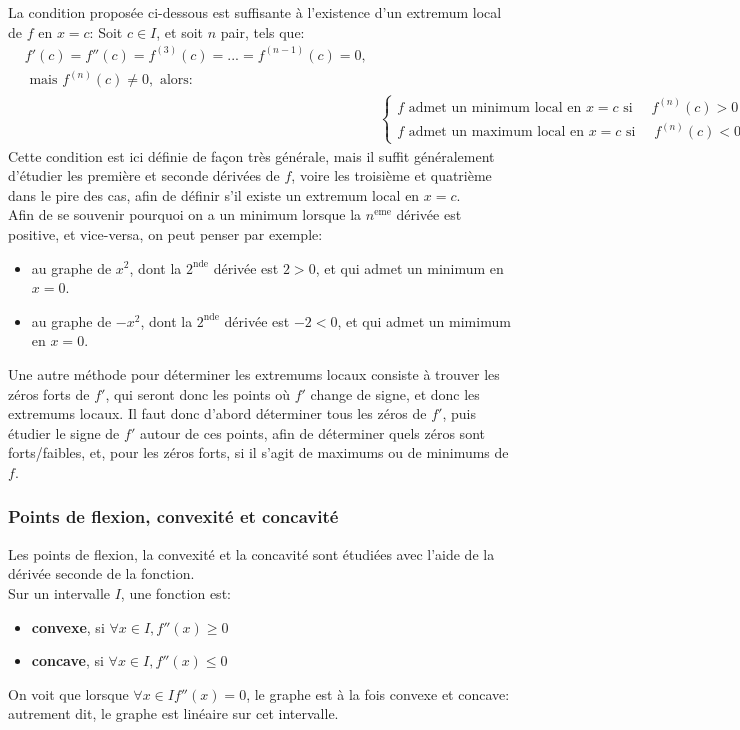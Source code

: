 \documentclass{article}
\begin{document}
La condition proposée ci-dessous est suffisante à l'existence d'un extremum local de \(f\) en \(x = c\):
Soit \(c \in I\), et soit \(n\) pair, tels que:
\begin{align*}
	&f'(c) = f''(c) = f^{(3)}(c) = ... = f^{(n-1)}(c) = 0, \\ 
	&\text{ mais } f^{(n)}(c) \neq 0, \text{ alors:} \\
	& &\begin{cases}
		f \text{ admet un minimum local en } x = c \text{ si } \quad f^{(n)}(c) > 0  \\
		f \text{ admet un maximum local en } x = c \text{ si } \quad f^{(n)}(c) < 0  
	\end{cases}
\end{align*}
Cette condition est ici définie de façon très générale, mais il suffit généralement d'étudier les première et seconde dérivées de \(f\), voire les troisième et quatrième dans le pire des cas, afin de définir s'il existe un extremum local en \(x = c\). \\
Afin de se souvenir pourquoi on a un minimum lorsque la \(n^\text{eme}\) dérivée est positive, et vice-versa, on peut penser par exemple:
\begin{itemize}
	\item au graphe de \(x^2\), dont la \(2^\text{nde}\) dérivée est \(2 > 0\), et qui admet un minimum en \(x = 0\).
	\item au graphe de \(-x^2\), dont la \(2^\text{nde}\) dérivée est  \(-2 < 0\), et qui admet un mimimum en \(x = 0\).
\end{itemize}

Une autre méthode pour déterminer les extremums locaux consiste à trouver les zéros forts de \(f'\), qui seront donc les points où \(f'\) change de signe, et donc les extremums locaux. Il faut donc d'abord déterminer tous les zéros de \(f'\), puis étudier le signe de \(f'\) autour de ces points, afin de déterminer quels zéros sont forts/faibles, et, pour les zéros forts, si il s'agit de maximums ou de minimums de \(f\).

\subsubsection{Points de flexion, convexité et concavité}
Les points de flexion, la convexité et la concavité sont étudiées avec l'aide de la dérivée seconde de la fonction. \\

Sur un intervalle \(I\), une fonction est:
\begin{itemize}
	\item \textbf{convexe}, si \(\forall x \in I, f''(x) \geq 0\)
	\item \textbf{concave}, si \(\forall x \in I, f''(x) \leq 0\)
\end{itemize}
On voit que lorsque \(\forall x \in I f''(x) = 0\), le graphe est à la fois convexe et concave: autrement dit, le graphe est linéaire sur cet intervalle.
\end{document}
